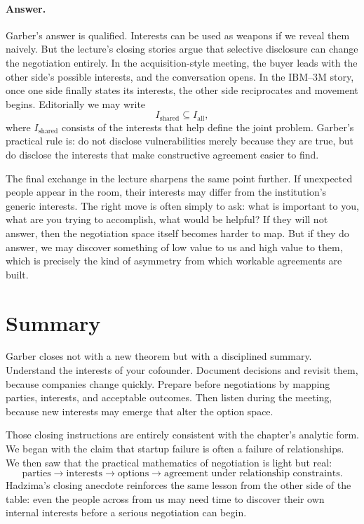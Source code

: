 \paragraph{Answer.} Garber's answer is qualified. Interests can be used as weapons if we reveal them naively. But the lecture's closing stories argue that selective disclosure can change the negotiation entirely. In the acquisition-style meeting, the buyer leads with the other side's possible interests, and the conversation opens. In the IBM--3M story, once one side finally states its interests, the other side reciprocates and movement begins. Editorially we may write
\begin{equation}
I_{\text{shared}} \subseteq I_{\text{all}},
\end{equation}
where \(I_{\text{shared}}\) consists of the interests that help define the joint problem. Garber's practical rule is: do not disclose vulnerabilities merely because they are true, but do disclose the interests that make constructive agreement easier to find.

The final exchange in the lecture sharpens the same point further. If unexpected people appear in the room, their interests may differ from the institution's generic interests. The right move is often simply to ask: what is important to you, what are you trying to accomplish, what would be helpful? If they will not answer, then the negotiation space itself becomes harder to map. But if they do answer, we may discover something of low value to us and high value to them, which is precisely the kind of asymmetry from which workable agreements are built.

\section{Summary}

Garber closes not with a new theorem but with a disciplined summary. Understand the interests of your cofounder. Document decisions and revisit them, because companies change quickly. Prepare before negotiations by mapping parties, interests, and acceptable outcomes. Then listen during the meeting, because new interests may emerge that alter the option space.

Those closing instructions are entirely consistent with the chapter's analytic form. We began with the claim that startup failure is often a failure of relationships. We then saw that the practical mathematics of negotiation is light but real:
\[
\text{parties} \longrightarrow \text{interests} \longrightarrow \text{options} \longrightarrow \text{agreement under relationship constraints}.
\]
Hadzima's closing anecdote reinforces the same lesson from the other side of the table: even the people across from us may need time to discover their own internal interests before a serious negotiation can begin.